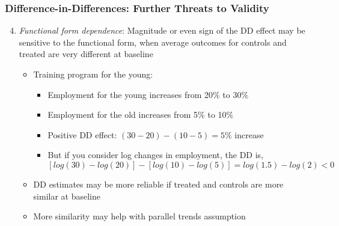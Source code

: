 \documentclass{beamer}
\numberwithin{equation}{section}
\begin{document}
\begin{frame}
  \frametitle{Difference-in-Differences: Further Threats to Validity}
\begin{enumerate}
\setcounter{enumi}{3}
 \item \emph{Functional form dependence}: Magnitude or even sign of the DD effect may be sensitive to the functional form, when average outcomes for controls and treated are very different at baseline
 \begin{itemize}\bigskip
 \item Training program for the young:\medskip
 \begin{itemize}
   \item Employment for the young increases from 20\% to 30\%
   \item Employment for the old increases from 5\% to 10\%
   \item Positive DD effect: $(30 - 20) - (10 - 5) = 5\%$ increase\medskip \pause
   \item But if you consider log changes in employment, the DD is,
$[log(30) - log(20)] - [log(10) - log(5)] = log(1.5)- log(2) < 0$
 \end{itemize}\bigskip
 \item DD estimates may be more reliable if treated and controls are more similar at baseline\medskip
 \item More similarity may help with parallel trends assumption
 \end{itemize}
\end{enumerate}
\end{frame}
\end{document}
